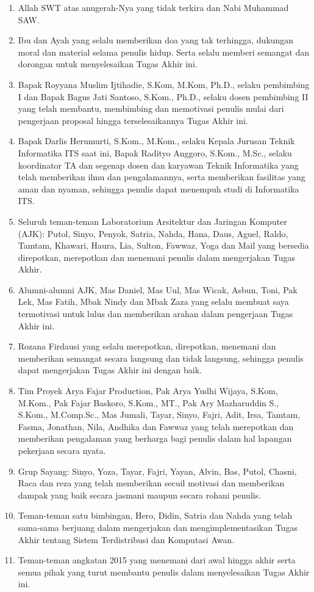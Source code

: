 		\begin{enumerate}
			\item Allah SWT atas anugerah-Nya yang tidak terkira dan Nabi Muhammad SAW.
			\item Ibu dan Ayah yang selalu memberikan doa yang tak terhingga, dukungan moral dan material selama penulis hidup. Serta selalu memberi semangat dan dorongan untuk menyelesaikan Tugas Akhir ini.
			\item Bapak Royyana Muslim Ijtihadie, S.Kom, M.Kom, Ph.D., selaku pembimbing I dan Bapak Bagus Jati Santoso, S.Kom., Ph.D., selaku dosen pembimbing II yang telah membantu, membimbing dan memotivasi penulis mulai dari pengerjaan proposal hingga terselesaikannya Tugas Akhir ini.
			\item Bapak Darlis Herumurti, S.Kom., M.Kom., selaku Kepala Jurusan Teknik Informatika ITS saat ini, Bapak Radityo Anggoro, S.Kom., M.Sc., selaku koordinator TA dan segenap dosen dan karyawan Teknik Informatika yang telah memberikan ilmu dan pengalamannya, serta memberikan fasilitas yang aman dan nyaman, sehingga penulis dapat menempuh studi di Informatika ITS.
			\item Seluruh teman-teman Laboratorium Arsitektur dan Jaringan Komputer (AJK): Putol, Sinyo, Penyok, Satria, Nahda, Hana, Daus, Aguel, Raldo, Tamtam, Khawari, Haura, Lia, Sulton, Fawwaz, Yoga dan Mail yang bersedia direpotkan, merepotkan dan menemani penulis dalam mengerjakan Tugas Akhir.
			\item Alumni-alumni AJK, Mas Daniel, Mas Uul, Mas Wicak, Asbun, Toni, Pak Lek, Mas Fatih, Mbak Nindy dan Mbak Zaza yang selalu membuat saya termotivasi untuk lulus dan memberikan arahan dalam pengerjaan Tugas Akhir ini.
			\item Rozana Firdausi yang selalu merepotkan, direpotkan, menemani dan memberikan semangat secara langsung dan tidak langsung, sehingga penulis dapat mengerjakan Tugas Akhir ini dengan baik.
			\item Tim Proyek Arya Fajar Production, Pak Arya Yudhi Wijaya, S.Kom, M.Kom., Pak Fajar Baskoro, S.Kom., MT., Pak Ary Mazharuddin S., S.Kom., M.Comp.Sc., Mas Jumali, Tayar, Sinyo, Fajri, Adit, Irsa, Tamtam, Fasma, Jonathan, Nila, Andhika dan Fawwaz yang telah merepotkan dan memberikan pengalaman yang berharga bagi penulis dalam hal lapangan pekerjaan secara nyata.
			\item Grup Sayang: Sinyo, Yoza, Tayar, Fajri, Yayan, Alvin, Bas, Putol, Chasni, Raca dan reza yang telah memberikan secuil motivasi dan memberikan dampak yang baik secara jasmani maupun secara rohani penulis.
			\item Teman-teman satu bimbingan, Hero, Didin, Satria dan Nahda yang telah sama-sama berjuang dalam mengerjakan dan mengimplementasikan Tugas Akhir tentang Sistem Terdistribusi dan Komputasi Awan.
			\item Teman-teman angkatan 2015 yang menemani dari awal hingga akhir serta semua pihak yang turut membantu penulis dalam menyelesaikan Tugas Akhir ini.
		\end{enumerate}
		
